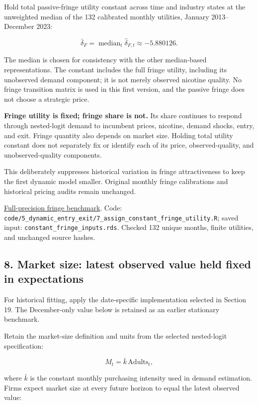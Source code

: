 \documentclass[10pt,]{article}
\begin{document}
Hold total passive-fringe utility constant across time and industry
states at the unweighted median of the 132 calibrated monthly utilities,
January 2013--December 2023:

\[
\bar\delta_F=\operatorname{median}_t\widehat\delta_{F,t}
\approx -5.880126.
\]

The median is chosen for consistency with the other median-based
representations. The constant includes the full fringe utility,
including its unobserved demand component; it is not merely observed
nicotine quality. No fringe transition matrix is used in this first
version, and the passive fringe does not choose a strategic price.

\textbf{Fringe utility is fixed; fringe share is not.} Its share
continues to respond through nested-logit demand to incumbent prices,
nicotine, demand shocks, entry, and exit. Fringe quantity also depends
on market size. Holding total utility constant does not separately fix
or identify each of its price, observed-quality, and unobserved-quality
components.

This deliberately suppresses historical variation in fringe
attractiveness to keep the first dynamic model smaller. Original monthly
fringe calibrations and historical pricing audits remain unchanged.

\href{../../output/dynamic_entry_exit/constant_fringe_2026-11-03/constant_fringe_utility.csv}{Full-precision
fringe benchmark}. Code:
\texttt{code/5\_dynamic\_entry\_exit/7\_assign\_constant\_fringe\_utility.R};
saved input: \texttt{constant\_fringe\_inputs.rds}. Checked 132 unique
months, finite utilities, and unchanged source hashes.

\subsection{8. Market size: latest observed value held fixed in
expectations}\label{market-size-latest-observed-value-held-fixed-in-expectations}

For historical fitting, apply the date-specific implementation selected
in Section 19. The December-only value below is retained as an earlier
stationary benchmark.

Retain the market-size definition and units from the selected
nested-logit specification:

\[
M_t=\bar{k}\,\mathrm{Adults}_t,
\]

where \(\bar{k}\) is the constant monthly purchasing intensity used in
demand estimation. Firms expect market size at every future horizon to
equal the latest observed value:
\end{document}
